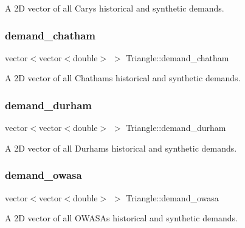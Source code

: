 A 2D vector of all Cary\textquotesingle{}s historical and synthetic demands. 

\mbox{\label{classTriangle_a82d188ad70195a5433e6a77d21697cb8}} 
\subsubsection{\texorpdfstring{demand\+\_\+chatham}{demand\_chatham}}
{\footnotesize\ttfamily vector$<$vector$<$double$>$ $>$ Triangle\+::demand\+\_\+chatham\hspace{0.3cm}{\ttfamily [private]}}



A 2D vector of all Chatham\textquotesingle{}s historical and synthetic demands. 

\mbox{\label{classTriangle_a0e82969571c5cdb51e98fe4b74a89597}} 
\subsubsection{\texorpdfstring{demand\+\_\+durham}{demand\_durham}}
{\footnotesize\ttfamily vector$<$vector$<$double$>$ $>$ Triangle\+::demand\+\_\+durham\hspace{0.3cm}{\ttfamily [private]}}



A 2D vector of all Durham\textquotesingle{}s historical and synthetic demands. 

\mbox{\label{classTriangle_a3a3e2438a3c125a53d08101dc0ba82ac}} 
\subsubsection{\texorpdfstring{demand\+\_\+owasa}{demand\_owasa}}
{\footnotesize\ttfamily vector$<$vector$<$double$>$ $>$ Triangle\+::demand\+\_\+owasa\hspace{0.3cm}{\ttfamily [private]}}



A 2D vector of all O\+W\+A\+SA\textquotesingle{}s historical and synthetic demands. 

